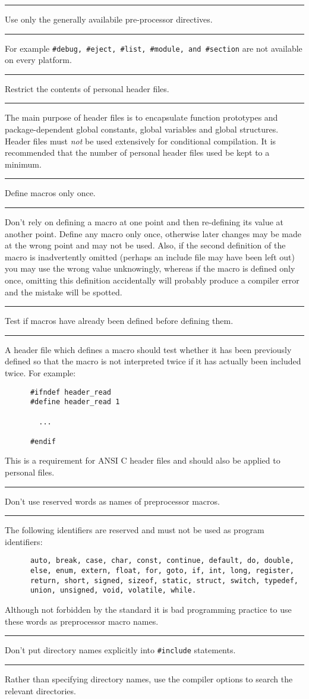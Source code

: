 \documentclass[twoside,11pt]{article}
\newcounter{sruleno}
\newcommand{\srule}[1]{
    \addtocounter{sruleno}{1}
    \goodbreak
    \rule[0.5ex]{\textwidth}{0.3mm}
    {\Large #1 \hfill {\thesruleno}}
    \rule[0.5ex]{\textwidth}{0.1mm}
}
\newcommand{\srule}[1]{
       \addtocounter{sruleno}{1}
       \begin{rawhtml} <HR> \end{rawhtml}
       {\Large \thesruleno}~~~~{\Large #1}
       \begin{rawhtml} <HR> \end{rawhtml}
       \end{tabular}
  }
\begin{document}
\newpage
\srule{Use only the generally availabile pre-processor directives.}
For example \verb~#debug, #eject, #list, #module, and #section~
are not available on every platform.

\srule{Restrict the contents of personal header files.}
The main purpose of header files is to encapsulate function prototypes
and package-dependent global constants, global variables and global structures.
Header files must {\sl not\/} be used extensively for conditional
compilation.  It is recommended that the number of personal header files used
be kept to a minimum.

\srule{Define macros only once.}
Don't rely on defining a macro at one point and then re-defining its
value at another point. Define any macro only once, otherwise later changes may
be made at the wrong point and may not be used. Also, if the second
definition of the macro is inadvertently omitted (perhaps an include
file may have been left out) you
may use the wrong value unknowingly,
whereas if the macro is defined
only once, omitting this definition accidentally will probably produce
a compiler error and the mistake will be spotted.


\srule{Test if macros have already been defined before defining them.}
A header file which defines a macro  should test whether it has been
previously defined  so that the macro is
not interpreted twice if it has actually been included twice. For example:
\begin{verbatim}
      #ifndef header_read
      #define header_read 1

        ...

      #endif
\end{verbatim}
This is a requirement for ANSI C header files and should also be applied to
personal files.

\srule{Don't use reserved words as names of preprocessor macros.}
The following identifiers are reserved and must not be used as program
identifiers:
\begin{verbatim}
      auto, break, case, char, const, continue, default, do, double,
      else, enum, extern, float, for, goto, if, int, long, register,
      return, short, signed, sizeof, static, struct, switch, typedef,
      union, unsigned, void, volatile, while.
\end{verbatim}
Although  not forbidden by the standard it is bad programming practice
to use these words as preprocessor macro names.


\srule{Don't put directory names explicitly into {\tt \#include} statements.}
Rather than specifying directory names, use the
compiler options to search the relevant directories.
\end{document}

